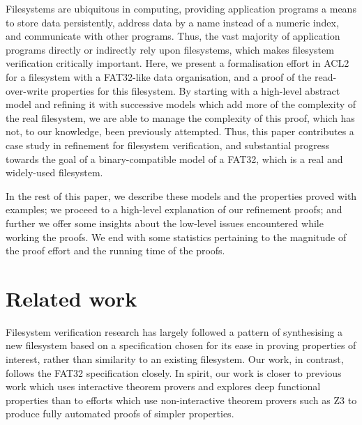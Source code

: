 \documentclass[runningheads,a4paper]{llncs}
\begin{document}
Filesystems are ubiquitous in computing, providing application
programs a means to store data persistently, address data by a name
instead of a numeric index, and communicate with other programs.
Thus, the vast majority of application programs
directly or indirectly rely upon filesystems, which makes filesystem
verification critically important. Here, we present a
formalisation effort in ACL2 for a filesystem with a FAT32-like data
organisation, and a proof of the read-over-write properties for this
filesystem. By starting with a high-level abstract model and refining
\cite{abadi1991existence} it with successive models which add more of
the complexity of the real filesystem, we are able to manage the
complexity of this proof, which has not, to our knowledge, been
previously attempted. Thus, this paper contributes a case study in
refinement for filesystem verification, and substantial progress
towards the goal of a binary-compatible model of a FAT32, which is a
real and widely-used filesystem.

In the rest of this paper, we describe these
models and the properties proved with examples; we proceed to a
high-level explanation of our refinement proofs; and further we offer
some insights about the low-level issues encountered while working the
proofs. We end with some statistics pertaining to the magnitude of the
proof effort and the running time of the proofs.

\section{Related work}

Filesystem verification research has largely followed a pattern of
synthesising a new filesystem based on a specification chosen for its
ease in proving properties of interest, rather than similarity to an
existing filesystem. Our work, in contrast, follows the FAT32
specification closely. In spirit, our work is closer to previous work
which uses interactive theorem provers and explores deep functional
properties than to efforts which use non-interactive theorem provers
such as Z3 to produce fully automated proofs of simpler properties.
\end{document}
